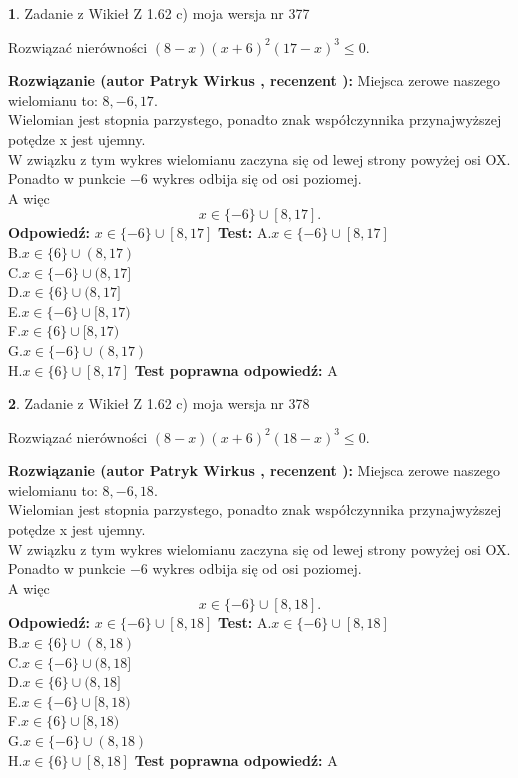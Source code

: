 \documentclass[12pt, a4paper]{article}
\theoremstyle{definition} %
\newtheorem{zad}{}
\newcommand{\zadStart}[1]{\begin{zad}#1\newline}
\newcommand{\zadStop}{\end{zad}}
\newcommand{\rozwStart}[2]{\noindent \textbf{Rozwiązanie (autor #1 , recenzent #2): }\newline}
\newcommand{\rozwStop}{\newline}
\newcommand{\odpStart}{\noindent \textbf{Odpowiedź:}\newline}
\newcommand{\odpStop}{\newline}
\newcommand{\testStart}{\noindent \textbf{Test:}\newline}
\newcommand{\testStop}{\newline}
\newcommand{\kluczStart}{\noindent \textbf{Test poprawna odpowiedź:}\newline}
\newcommand{\kluczStop}{\newline}
\begin{document}
\zadStart{Zadanie z Wikieł Z 1.62 c) moja wersja nr 377}

Rozwiązać nierówności $(8-x)(x+6)^{2}(17-x)^{3}\le0$.
\zadStop
\rozwStart{Patryk Wirkus}{}
Miejsca zerowe naszego wielomianu to: $8, -6, 17$.\\
Wielomian jest stopnia parzystego, ponadto znak współczynnika przy\linebreak najwyższej potędze x jest ujemny.\\ W związku z tym wykres wielomianu zaczyna się od lewej strony powyżej osi OX.\\
Ponadto w punkcie $-6$ wykres odbija się od osi poziomej.\\
A więc $$x \in \{-6\} \cup [8,17].$$
\rozwStop
\odpStart
$x \in \{-6\} \cup [8,17]$
\odpStop
\testStart
A.$x \in \{-6\} \cup [8,17]$\\
B.$x \in \{6\} \cup (8,17)$\\
C.$x \in \{-6\} \cup (8,17]$\\
D.$x \in \{6\} \cup (8,17]$\\
E.$x \in \{-6\} \cup [8,17)$\\
F.$x \in \{6\} \cup [8,17)$\\
G.$x \in \{-6\} \cup (8,17)$\\
H.$x \in \{6\} \cup [8,17]$
\testStop
\kluczStart
A
\kluczStop



\zadStart{Zadanie z Wikieł Z 1.62 c) moja wersja nr 378}

Rozwiązać nierówności $(8-x)(x+6)^{2}(18-x)^{3}\le0$.
\zadStop
\rozwStart{Patryk Wirkus}{}
Miejsca zerowe naszego wielomianu to: $8, -6, 18$.\\
Wielomian jest stopnia parzystego, ponadto znak współczynnika przy\linebreak najwyższej potędze x jest ujemny.\\ W związku z tym wykres wielomianu zaczyna się od lewej strony powyżej osi OX.\\
Ponadto w punkcie $-6$ wykres odbija się od osi poziomej.\\
A więc $$x \in \{-6\} \cup [8,18].$$
\rozwStop
\odpStart
$x \in \{-6\} \cup [8,18]$
\odpStop
\testStart
A.$x \in \{-6\} \cup [8,18]$\\
B.$x \in \{6\} \cup (8,18)$\\
C.$x \in \{-6\} \cup (8,18]$\\
D.$x \in \{6\} \cup (8,18]$\\
E.$x \in \{-6\} \cup [8,18)$\\
F.$x \in \{6\} \cup [8,18)$\\
G.$x \in \{-6\} \cup (8,18)$\\
H.$x \in \{6\} \cup [8,18]$
\testStop
\kluczStart
A
\kluczStop
\end{document}
